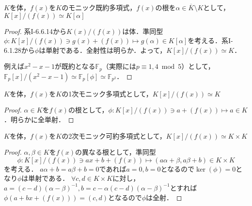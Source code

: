\begin{screen}
  $K$を体，$f(x)$を$K$のモニック既約多項式，$f(x)$の根を$\alpha\in\overline{K}\setminus K$として，$K[x]/(f(x))\simeq K[\alpha]$
\end{screen}
\begin{proof}
  系I-6.6.14から$K(x)/(f(x))$は体．準同型$\phi\colon K[x]/(f(x))\ni g(x) + (f(x))\mapsto g(\alpha)\in K[\alpha]$を考える．系I-6.1.28から$\phi$は単射である．全射性は明らか．よって，$K[x]/(f(x))\simeq K$．

  例えば$x^2-x-1$が既約となる$\mathbb{F}_p$（実際には$p\equiv 1, 4\bmod5$）として，$\mathbb{F}_p[x]/(x^2-x-1)\simeq\mathbb{F}_p[\phi]\simeq\mathbb{F}_{p^2}$．
\end{proof}

\begin{screen}
  $K$を体，$f(x)$を$K$の1次モニック多項式として，$K[x]/(f(x))\simeq K$
\end{screen}
\begin{proof}
  $\alpha\in K$を$f(x)$の根として，$\phi\colon K[x]/(f(x))\ni a + (f(x))\mapsto a\in K$．明らかに全単射．
\end{proof}

\begin{screen}
  $K$を体，$f(x)$を$K$の2次モニック可約多項式として，$K[x]/(f(x))\simeq K\times K$
\end{screen}
\begin{proof}
  $\alpha, \beta\in K$を$f(x)$の異なる根として，準同型
    \[\phi\colon K[x]/(f(x))\ni ax + b + (f(x))\mapsto(a\alpha + \beta, a\beta + b)\in K\times K\]
    を考える．
    $a\alpha + b = a\beta + b = 0$であれば$a = 0, b = 0$となるので$\ker(\phi) = 0$となり$\phi$は単射である．
    $\forall c, d\in K\times K$に対し，$a = (c-d)(\alpha-\beta)^{-1}, b = c-\alpha(c-d)(\alpha-\beta)^{-1}$とすれば$\phi(a + bx + (f(x))) = (c, d)$となるので$\phi$は全射．
\end{proof}

